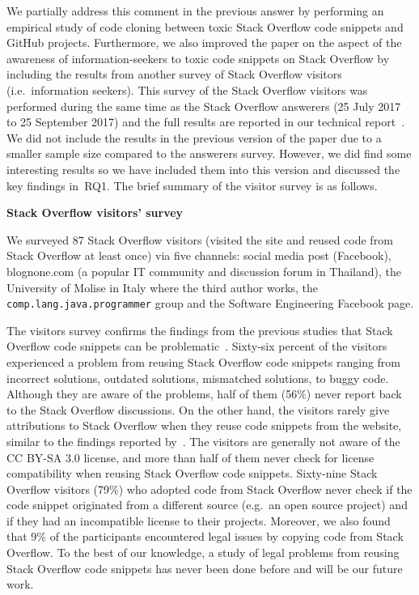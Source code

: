 \documentclass[a4paper,twoside,10pt]{reviewresponse}
\begin{document}
We partially address this comment in the previous answer by performing an
empirical study of code cloning between toxic Stack Overflow code snippets and
GitHub projects. Furthermore, we also improved the paper on the aspect of the
awareness of information-seekers to toxic code snippets on Stack Overflow by
including the results from another survey of Stack Overflow visitors
(i.e.~information seekers). This survey of the Stack Overflow visitors was
performed during the same time as the Stack Overflow answerers (25 July 2017 to
25 September 2017) and the full results are reported in our technical
report~\citep{Ragkhitwetsagul_RN2017}. We did not include the results in the
previous version of the paper due to a smaller sample size compared to the
answerers survey. However, we did find some interesting results so we have
included them into this version and discussed the key findings in~RQ1. The brief
summary of the visitor survey is as follows.

\textbf{Stack Overflow visitors' survey}

We surveyed 87 Stack Overflow visitors (visited the site and reused code from Stack
Overflow at least once) via five channels: social media post (Facebook),
\textsf{blognone.com} (a popular IT community and discussion forum in Thailand),
the University of Molise in Italy where the third author works, the
\texttt{comp.lang.java.programmer} group and the Software Engineering Facebook
page.

The visitors survey confirms the findings from the previous studies that Stack
Overflow code snippets can be problematic~\citep{Zhang2018,Acar2016,An2017}. Sixty-six
percent of the visitors experienced a problem from reusing Stack Overflow code
snippets ranging from incorrect solutions, outdated solutions, mismatched
solutions, to buggy code. Although they are aware of the problems, half of them
(56\%) never report back to the Stack Overflow discussions. On the other hand,
the visitors rarely give attributions to Stack Overflow when they reuse code
snippets from the website, similar to the findings reported
by~\cite{Baltes2017}. The visitors are generally not aware of the CC BY-SA 3.0
license, and more than half of them never check for license compatibility when
reusing Stack Overflow code snippets. 
Sixty-nine Stack Overflow visitors (79\%) who adopted code from Stack Overflow never 
check if the code snippet originated from a different source (e.g.~an open source project) 
and if they had an incompatible license to their projects.
Moreover, we also found that 9\% of the participants
encountered legal issues by copying code from Stack Overflow. To the best of our
knowledge, a study of legal problems from reusing Stack Overflow code snippets
has never been done before and will be our future work.
\end{document}
